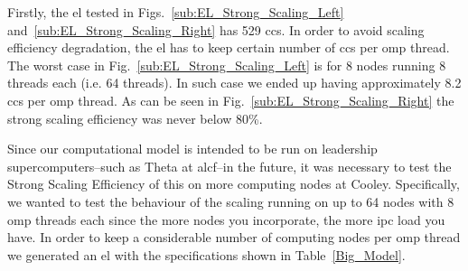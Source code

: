 \documentclass[10pt,journal,compsoc]{IEEEtran}
\begin{document}
Firstly, the \gls{el} tested in Figs.~\ref{sub:EL_Strong_Scaling_Left} and~\ref{sub:EL_Strong_Scaling_Right} has 529 \glspl{cc}. In order to avoid scaling efficiency degradation, the \gls{el} has to keep certain number of \glspl{cc} per \gls{omp} thread. The worst case in Fig.~\ref{sub:EL_Strong_Scaling_Left} is for 8 nodes running 8 threads each (i.e. 64 threads). In such case we ended up having approximately 8.2 \glspl{cc} per \gls{omp} thread. As can be seen in Fig.~\ref{sub:EL_Strong_Scaling_Right} the strong scaling efficiency was never below 80\%. 

Since our computational model is intended to be run on leadership supercomputers--such as Theta at \gls{alcf}--in the future, it was necessary to test the Strong Scaling Efficiency of this on more computing nodes at Cooley. Specifically, we wanted to test the behaviour of the scaling running on up to 64 nodes with 8 \gls{omp} threads each since the more nodes you incorporate, the more \gls{ipc} load you have. In order to keep a considerable number of computing nodes per \gls{omp} thread we generated an \gls{el} with the specifications shown in Table~\ref{Big_Model}. 
\end{document}
